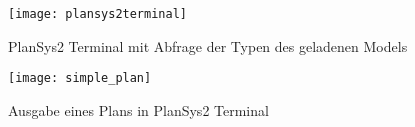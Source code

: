 \begin{figure}[ht!]
    \centering
    \texttt{[image: plansys2terminal]}
    \caption{\acs{PlanSys2} Terminal mit Abfrage der Typen des geladenen Models}
    \label{fig:plansysterminal}
\end{figure}

\begin{figure}[ht!]
    \centering
    \texttt{[image: simple\_plan]}
    \caption{Ausgabe eines Plans in \ac{PlanSys2} Terminal}
    \label{fig:terminalplan}
\end{figure}